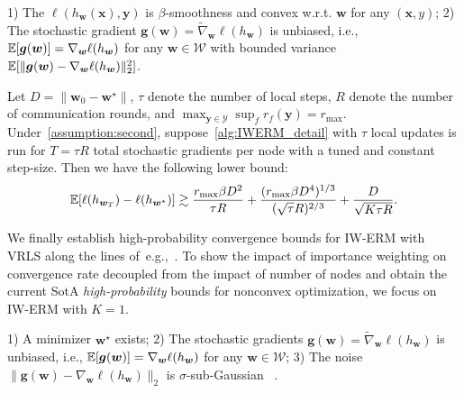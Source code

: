 \begin{assumption}
\label{assumption:second} 1) The $\ell(h_{\boldsymbol{w}}(\boldsymbol{x}),\boldsymbol{y})$ is $\beta$-smoothness and convex w.r.t. $\boldsymbol{w}$ for any $(\boldsymbol{x},y)$; 2) The stochastic gradient $\boldsymbol{g}(\boldsymbol{w})=\widetilde\nabla_{\boldsymbol{w}}\ell(h_{\boldsymbol{w}})$ is unbiased, i.e., $\mathbb{E}[\boldsymbol{g}(\boldsymbol{w})]=\nabla_{\boldsymbol{w}}\ell(h_{\boldsymbol{w}})$ for any $\boldsymbol{w}\in\mathcal{W}$ with bounded variance  $\mathbb{E}[\|\boldsymbol{g}(\boldsymbol{w})-\nabla_{\boldsymbol{w}}\ell(h_{\boldsymbol{w}})\|_2^2]$.
\end{assumption}

\begin{theorem}
\label{app:second} Let $D=\|\boldsymbol{w}_0-\boldsymbol{w}^\star\|$, $\tau$ denote the number of local steps,  $R$ denote the number of communication rounds, and $\max_{\boldsymbol{y}\in\mathcal{Y}}\sup_f r_f(\boldsymbol{y})=r_{\max}$. Under~\cref{assumption:second}, suppose~\cref{alg:IWERM_detail} with $\tau$ local updates is run for $T=\tau R$ total stochastic gradients per node with a tuned and constant step-size. Then we have the following lower bound: 
\begin{align}
\mathbb{E}[\ell(h_{\boldsymbol{w}_T})-\ell(h_{\boldsymbol{w}^\star})]
\gtrsim \frac{r_{\max}\beta D^2}{\tau R}+\frac{(r_{\max}\beta D^4)^{1/3}}{(\sqrt{\tau}R)^{2/3}} +\frac{D}{\sqrt{K\tau R}}.   
\end{align}
\end{theorem}

We finally establish high-probability convergence bounds for IW-ERM with VRLS along the lines of~e.g.,~\citep[Theorem 4.1]{liu2023high}. To show the impact of importance weighting on convergence rate decoupled from the impact of number of nodes and obtain the current SotA {\it high-probability} bounds for nonconvex optimization, we focus on IW-ERM with $K=1$. 
\begin{assumption}
\label{assumption:noise} 1) A minimizer $\boldsymbol{w}^\star$ exists; 2) The stochastic gradients $\boldsymbol{g}(\boldsymbol{w})=\widetilde\nabla_{\boldsymbol{w}}\ell(h_{\boldsymbol{w}})$ is unbiased, i.e., $\mathbb{E}[\boldsymbol{g}(\boldsymbol{w})]=\nabla_{\boldsymbol{w}}\ell(h_{\boldsymbol{w}})$ for any $\boldsymbol{w}\in\mathcal{W}$; 3) The noise $\|\boldsymbol{g}(\boldsymbol{w})-\nabla_{\boldsymbol{w}}\ell(h_{\boldsymbol{w}})\|_2$ is $\sigma$-sub-Gaussian ~\citep{vershynin2018high}.

\end{assumption}

